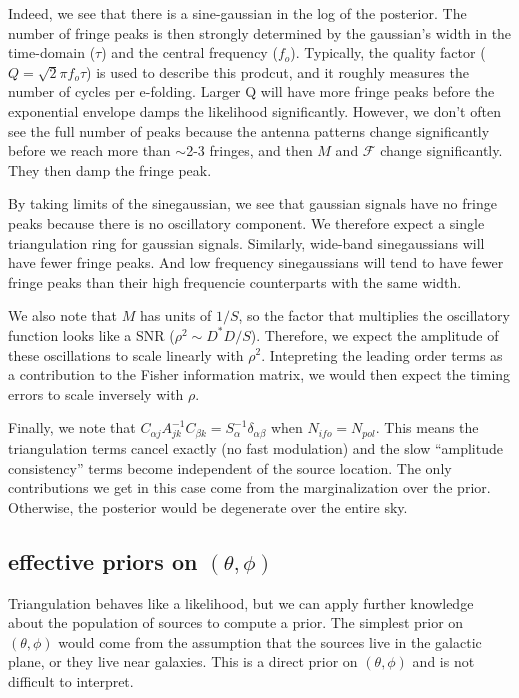 \documentclass[10pt]{article}
\begin{document}
Indeed, we see that there is a sine-gaussian in the log of the posterior. The number of fringe peaks is then strongly determined by the gaussian's width in the time-domain ($\tau$) and the central frequency ($f_o$). Typically, the quality factor ($Q=\sqrt{2}\pi f_o\tau$) is used to describe this prodcut, and it roughly measures the number of cycles per e-folding. Larger Q will have more fringe peaks before the exponential envelope damps the likelihood significantly. However, we don't often see the full number of peaks because the antenna patterns change significantly before we reach more than $\sim$2-3 fringes, and then $M$ and $\mathcal{F}$ change significantly. They then damp the fringe peak. 

By taking limits of the sinegaussian, we see that gaussian signals have no fringe peaks because there is no oscillatory component. We therefore expect a single triangulation ring for gaussian signals. Similarly, wide-band sinegaussians will have fewer fringe peaks. And low frequency sinegaussians will tend to have fewer fringe peaks than their high frequencie counterparts with the same width.

We also note that $M$ has units of $1/S$, so the factor that multiplies the oscillatory function looks like a SNR ($\rho^2\sim D^\ast D/S$). Therefore, we expect the amplitude of these oscillations to scale linearly with $\rho^2$. Intepreting the leading order terms as a contribution to the Fisher information matrix, we would then expect the timing errors to scale inversely with $\rho$. 

Finally, we note that $C_{\alpha j}A^{-1}_{jk}C_{\beta k} = S_\alpha^{-1}\delta_{\alpha\beta}$ when $N_{ifo}=N_{pol}$. This means the triangulation terms cancel exactly (no fast modulation) and the slow ``amplitude consistency'' terms become independent of the source location. The only contributions we get in this case come from the marginalization over the prior. Otherwise, the posterior would be degenerate over the entire sky.

\subsection{effective priors on $(\theta,\phi)$}

Triangulation behaves like a likelihood, but we can apply further knowledge about the population of sources to compute a prior. The simplest prior on $(\theta,\phi)$ would come from the assumption that the sources live in the galactic plane, or they live near galaxies. This is a direct prior on $(\theta,\phi)$ and is not difficult to interpret.
\end{document}
